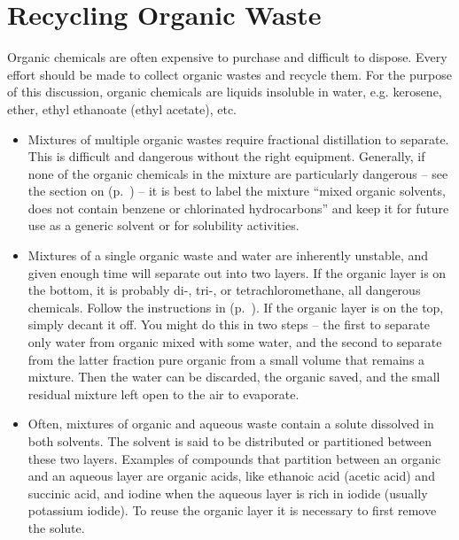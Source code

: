 \section{Recycling Organic Waste} 

Organic chemicals are often expensive 
to purchase and difficult to dispose. 
Every effort should be made to collect organic wastes and recycle them. 
For the purpose of this discussion, 
organic chemicals are liquids insoluble in water, 
e.g. 
kerosene, 
ether, 
ethyl ethanoate (ethyl acetate), 
etc.

\begin{itemize}
\item Mixtures of multiple organic wastes 
require fractional distillation to separate. 
This is difficult and dangerous without the right equipment. 
Generally, 
if none of the organic chemicals in the mixture are particularly dangerous – 
see the section on  (p.~\pageref{cha:dangerchem}) – 
it is best to label the mixture “mixed organic solvents, 
does not contain benzene or chlorinated hydrocarbons” 
and keep it for future use as a generic solvent or for solubility activities.

\item Mixtures of a single organic waste and water are inherently unstable, 
and given enough time will separate out into two layers. 
If the organic layer is on the bottom, 
it is probably di-, 
tri-, 
or tetrachloromethane, 
all dangerous chemicals. 
Follow the instructions in  (p.~\pageref{cha:dangerchem}). 
If the organic layer is on the top, 
simply decant it off. 
You might do this in two steps – 
the first to separate only water from organic mixed with some water, 
and the second to separate from the latter fraction pure organic 
from a small volume that remains a mixture. 
Then the water can be discarded, 
the organic saved, 
and the small residual mixture left open to the air to evaporate.

\item Often, 
mixtures of organic and aqueous waste 
contain a solute dissolved in both solvents. 
The solvent is said to be distributed 
or partitioned between these two layers. 
Examples of compounds that partition between an organic 
and an aqueous layer are organic acids, 
like ethanoic acid (acetic acid) and succinic acid, 
and iodine when the aqueous layer is rich in iodide 
(usually potassium iodide). 
To reuse the organic layer it is necessary to first remove the solute.


\end{itemize}

